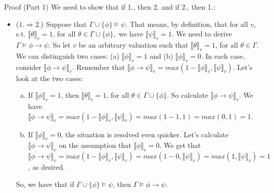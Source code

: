 \documentclass[../slides.tex]{subfiles}
\begin{document}
\begin{frame}{Proof (Part 1)}
We need to show that if 1., then 2. and if 2., then 1.:
			
			\begin{itemize}
			
				\item ($1.\Rightarrow 2.$) Suppose that $\Gamma\cup\{\phi\}\vDash\psi$. That means, by definition, that for all $v$, s.t. $\llbracket\theta\rrbracket_v=1$, for all $\theta\in \Gamma\cup\{\phi\},$ we have $\llbracket\psi\rrbracket_v=1$. We need to derive $\Gamma\vDash \phi\to\psi$. So let $v$ be an arbitrary valuation such that $\llbracket\theta\rrbracket_v=1$, for all $\theta\in \Gamma$. We can distinguish two cases: (a) $\llbracket \phi\rrbracket_v=1$ and (b) $\llbracket \phi\rrbracket_v=0$. In each case, consider  $\llbracket\phi\to\psi\rrbracket_v$. Remember that $\llbracket\phi\to\psi\rrbracket_v=max(1-\llbracket\phi\rrbracket_v,\llbracket\psi\rrbracket_v)$. Let's look at the two cases:
				\begin{enumerate}[(a)]
				
					\item If $\llbracket \phi\rrbracket_v=1$, then $\llbracket\theta\rrbracket_v=1$, for all $\theta\in \Gamma\cup\{\phi\}$. So calculate $\llbracket\phi\to\psi\rrbracket_v$. We have $\llbracket\phi\to\psi\rrbracket_v=max(1-\llbracket\phi\rrbracket_v,\llbracket\psi\rrbracket_v)=max(1-1,1)=max(0,1)=1$.
					
					\item If $\llbracket \phi\rrbracket_v=0$, the situation is resolved even quicker. Let's calculate $\llbracket\phi\to\psi\rrbracket_v$ on the assumption that $\llbracket \phi\rrbracket_v=0$. We get that $\llbracket\phi\to\psi\rrbracket_v=max(1-\llbracket\phi\rrbracket_v,\llbracket\psi\rrbracket_v)=max(1-0, \llbracket\psi\rrbracket_v)=max(1, \llbracket\psi\rrbracket_v)=1$, as desired.
					
				\end{enumerate}
			So, we have that if $\Gamma\cup\{\phi\}\vDash\psi$, then $\Gamma\vDash\phi\to\psi$.


\end{itemize}

\end{frame}
\end{document}
